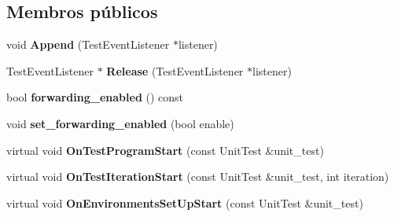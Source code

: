 \subsection*{Membros públicos}
\begin{DoxyCompactItemize}
\item 
\hypertarget{classtesting_1_1internal_1_1TestEventRepeater_ad154ce021881721a5c46994316b14cb1}{void {\bfseries Append} (Test\-Event\-Listener $\ast$listener)}\label{classtesting_1_1internal_1_1TestEventRepeater_ad154ce021881721a5c46994316b14cb1}

\item 
\hypertarget{classtesting_1_1internal_1_1TestEventRepeater_ac77a3d127e4726e11694e4ee9cf3b793}{Test\-Event\-Listener $\ast$ {\bfseries Release} (Test\-Event\-Listener $\ast$listener)}\label{classtesting_1_1internal_1_1TestEventRepeater_ac77a3d127e4726e11694e4ee9cf3b793}

\item 
\hypertarget{classtesting_1_1internal_1_1TestEventRepeater_a65c4a855a505ff74c843cf50ad56b4c1}{bool {\bfseries forwarding\-\_\-enabled} () const }\label{classtesting_1_1internal_1_1TestEventRepeater_a65c4a855a505ff74c843cf50ad56b4c1}

\item 
\hypertarget{classtesting_1_1internal_1_1TestEventRepeater_a86c52e311b70598a385a0589277e92e0}{void {\bfseries set\-\_\-forwarding\-\_\-enabled} (bool enable)}\label{classtesting_1_1internal_1_1TestEventRepeater_a86c52e311b70598a385a0589277e92e0}

\item 
\hypertarget{classtesting_1_1internal_1_1TestEventRepeater_a15ee2ff051063088d3a89a266d5ffcc4}{virtual void {\bfseries On\-Test\-Program\-Start} (const Unit\-Test \&unit\-\_\-test)}\label{classtesting_1_1internal_1_1TestEventRepeater_a15ee2ff051063088d3a89a266d5ffcc4}

\item 
\hypertarget{classtesting_1_1internal_1_1TestEventRepeater_a4062b3f070bb6531ab8494c13d3635d3}{virtual void {\bfseries On\-Test\-Iteration\-Start} (const Unit\-Test \&unit\-\_\-test, int iteration)}\label{classtesting_1_1internal_1_1TestEventRepeater_a4062b3f070bb6531ab8494c13d3635d3}

\item 
\hypertarget{classtesting_1_1internal_1_1TestEventRepeater_ae71819925adec0471fa7abc5072b8244}{virtual void {\bfseries On\-Environments\-Set\-Up\-Start} (const Unit\-Test \&unit\-\_\-test)}\label{classtesting_1_1internal_1_1TestEventRepeater_ae71819925adec0471fa7abc5072b8244}


\end{DoxyCompactItemize}
